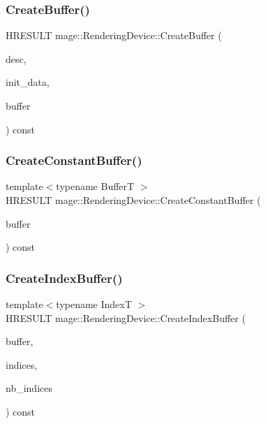\subsubsection{\texorpdfstring{Create\+Buffer()}{CreateBuffer()}}
{\footnotesize\ttfamily H\+R\+E\+S\+U\+LT mage\+::\+Rendering\+Device\+::\+Create\+Buffer (\begin{DoxyParamCaption}\item[{const D3\+D11\+\_\+\+B\+U\+F\+F\+E\+R\+\_\+\+D\+E\+SC $\ast$}]{desc,  }\item[{const D3\+D11\+\_\+\+S\+U\+B\+R\+E\+S\+O\+U\+R\+C\+E\+\_\+\+D\+A\+TA $\ast$}]{init\+\_\+data,  }\item[{I\+D3\+D11\+Buffer $\ast$$\ast$}]{buffer }\end{DoxyParamCaption}) const}

\hypertarget{classmage_1_1_rendering_device_a1b1042d6a5f8a61a81bf1ea5ebc8e058}{}\label{classmage_1_1_rendering_device_a1b1042d6a5f8a61a81bf1ea5ebc8e058} 
\subsubsection{\texorpdfstring{Create\+Constant\+Buffer()}{CreateConstantBuffer()}}
{\footnotesize\ttfamily template$<$typename BufferT $>$ \\
H\+R\+E\+S\+U\+LT mage\+::\+Rendering\+Device\+::\+Create\+Constant\+Buffer (\begin{DoxyParamCaption}\item[{I\+D3\+D11\+Buffer $\ast$$\ast$}]{buffer }\end{DoxyParamCaption}) const}

\hypertarget{classmage_1_1_rendering_device_a35cbf8e00a3c5a70ed7797063a5eb879}{}\label{classmage_1_1_rendering_device_a35cbf8e00a3c5a70ed7797063a5eb879} 
\subsubsection{\texorpdfstring{Create\+Index\+Buffer()}{CreateIndexBuffer()}}
{\footnotesize\ttfamily template$<$typename IndexT $>$ \\
H\+R\+E\+S\+U\+LT mage\+::\+Rendering\+Device\+::\+Create\+Index\+Buffer (\begin{DoxyParamCaption}\item[{I\+D3\+D11\+Buffer $\ast$$\ast$}]{buffer,  }\item[{const IndexT $\ast$}]{indices,  }\item[{size\+\_\+t}]{nb\+\_\+indices }\end{DoxyParamCaption}) const}


